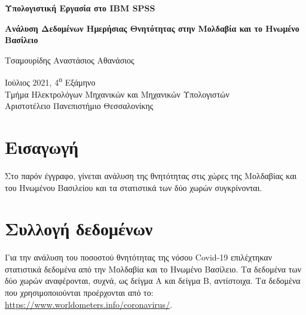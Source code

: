 \documentclass{article}
\begin{document}
\begin{titlepage}
    \begin{center}
        \vspace*{1cm}
            
        \Huge
        \textbf{Υπολογιστική Εργασία στο \foreignlanguage{english}{IBM SPSS}}
            
        \vspace{0.5cm}
        \LARGE
        \textbf{Ανάλυση Δεδομένων Ημερήσιας Θνητότητας στην Μολδαβία και το Ηνωμένο Βασίλειο}
            
        \vspace{1.5cm}
            
        Τσαμουρίδης Αναστάσιος Αθανάσιος \\
            
        \vfill
            
        \Large
        Ιούλιος 2021, 4\textsuperscript{ο} Εξάμηνο \\
        Τμήμα Ηλεκτρολόγων Μηχανικών και Μηχανικών Υπολογιστών\\
        Αριστοτέλειο Πανεπιστήμιο Θεσσαλονίκης\\
        
    \end{center}
\end{titlepage}

\author{}
\date{}

\newpage

\tableofcontents

\newpage
\section{Εισαγωγή}

    Στο παρόν έγγραφο, γίνεται ανάλυση της θνητότητας στις χώρες της Μολδαβίας και του Ηνωμένου Βασιλείου και τα στατιστικά των δύο χωρών συγκρίνονται. 
    
\section{Συλλογή δεδομένων}

    Για την ανάλυση του ποσοστού θνητότητας της νόσου \foreignlanguage{english}{Covid-19} επιλέχτηκαν στατιστικά δεδομένα από την Μολδαβία και το Ηνωμένο Βασίλειο. Τα δεδομένα των δύο χωρών αναφέρονται, συχνά, ως δείγμα Α και δείγμα Β, αντίστοιχα. Τα δεδομένα που χρησιμοποιούνται προέρχονται από το:\newline
    \href{https://www.worldometers.info/coronavirus/}{\foreignlanguage{english}{https://www.worldometers.info/coronavirus/}}.
\end{document}
